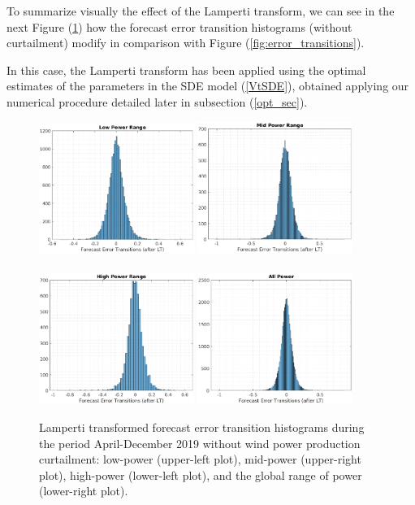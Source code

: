 \documentclass[11pt]{article}
\theoremstyle{definition}
\begin{document}
To summarize visually the effect of the Lamperti transform, we can see in the next Figure (\ref{fig:LP_transitions}) how the forecast error transition histograms (without curtailment) modify in comparison with Figure (\ref{fig:error_transitions}).

In this case, the Lamperti transform has been applied using the optimal estimates of the parameters in the SDE model (\ref{VtSDE}), obtained applying our numerical procedure detailed later in subsection (\ref{opt_sec}).  

\begin{figure}[H]
\centering
\includegraphics[width=0.45\textwidth]{plots/LP_t_LP.eps}
\includegraphics[width=0.45\textwidth]{plots/MP_t_LP.eps}\\
\quad\\
\includegraphics[width=0.45\textwidth]{plots/HP_t_LP.eps}
\includegraphics[width=0.45\textwidth]{plots/AP_t_LP.eps}
\caption{Lamperti transformed forecast error transition histograms during the period April-December 2019 without wind power production curtailment: low-power (upper-left plot), mid-power (upper-right plot), high-power (lower-left plot), and the global range of power (lower-right plot).}
  \label{fig:LP_transitions}
\end{figure}
\end{document}
